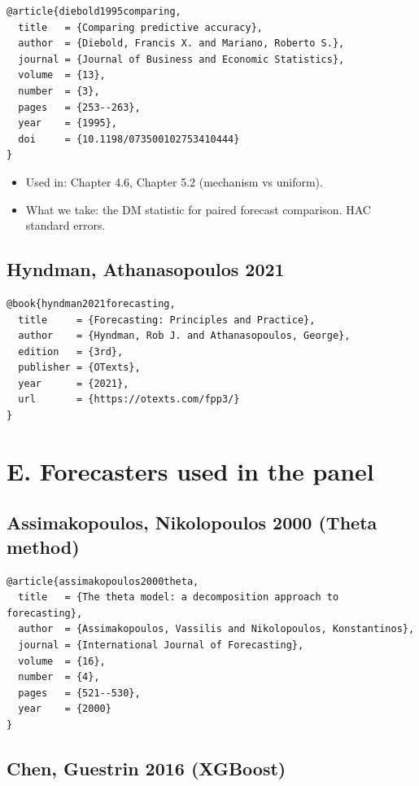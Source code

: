 \documentclass[11pt,a4paper,openany]{report}
\begin{document}
\begin{verbatim}
@article{diebold1995comparing,
  title   = {Comparing predictive accuracy},
  author  = {Diebold, Francis X. and Mariano, Roberto S.},
  journal = {Journal of Business and Economic Statistics},
  volume  = {13},
  number  = {3},
  pages   = {253--263},
  year    = {1995},
  doi     = {10.1198/073500102753410444}
}
\end{verbatim}

\begin{itemize}
  \item Used in: Chapter 4.6, Chapter 5.2 (mechanism vs uniform).
  \item What we take: the DM statistic for paired forecast comparison. HAC
    standard errors.
\end{itemize}

\subsection{Hyndman, Athanasopoulos 2021}

\begin{verbatim}
@book{hyndman2021forecasting,
  title     = {Forecasting: Principles and Practice},
  author    = {Hyndman, Rob J. and Athanasopoulos, George},
  edition   = {3rd},
  publisher = {OTexts},
  year      = {2021},
  url       = {https://otexts.com/fpp3/}
}
\end{verbatim}

\section{E. Forecasters used in the panel}

\subsection{Assimakopoulos, Nikolopoulos 2000 (Theta method)}

\begin{verbatim}
@article{assimakopoulos2000theta,
  title   = {The theta model: a decomposition approach to forecasting},
  author  = {Assimakopoulos, Vassilis and Nikolopoulos, Konstantinos},
  journal = {International Journal of Forecasting},
  volume  = {16},
  number  = {4},
  pages   = {521--530},
  year    = {2000}
}
\end{verbatim}

\subsection{Chen, Guestrin 2016 (XGBoost)}
\end{document}
